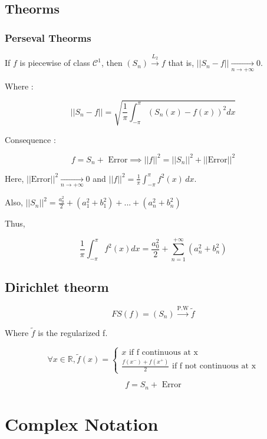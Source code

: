 \documentclass[a4paper,12pt]{article}
\begin{document}
\subsection{Theorms}

\subsubsection{Perseval Theorms}

If $f$ is piecewise of class $\mathcal{C}^1$, then $(S_n) \overset{L_2}{\rightarrow} f$ that is, $||S_n - f|| \underset{n \rightarrow +\infty}{\rightarrow} 0$. \newline

Where : 

\[
||S_n - f|| = \sqrt{\frac{1}{\pi}\int_{-\pi}^{\pi}{(S_n(x) - f(x))^2 dx}}
\]

Consequence :

\[
f = S_n + \text{ Error} \implies ||f||^2 = ||S_n||^2 + ||\text{Error}||^2
\] \newline

Here, $||\text{Error}||^2 \underset{n \rightarrow +\infty}{\rightarrow} 0$ and $||f||^2 = \frac{1}{\pi}\int_{-\pi}^{\pi}{f^2(x)\,dx}$. \newline

Also, $||S_n||^2 = \frac{a_0^2}{2} + (a_1^2 + b_1^2) + ... + (a_n^2 + b_n^2)$ \newline

Thus, 

\[
\frac{1}{\pi}\int_{-\pi}^{\pi}{f^2(x)dx} = \frac{a_0^2}{2} + \sum_{n = 1}^{+\infty}{(a_n^2 + b_n^2)}
\]

\subsection{Dirichlet theorm}

\[
FS(f) = (S_n) \overset{\text{P.W}}{\rightarrow} \tilde{f}   
\]

Where $\tilde{f}$ is the regularized f.

\[
\forall x \in \mathbb{R}, \tilde{f}(x) = \begin{cases}
    x \text{ if f continuous at x} \\
    \frac{f(x^-) + f(x^+)}{2} \text{ if f not continuous at x}
\end{cases}
\]

\[
f = S_n + \text{ Error}
\]

\section{Complex Notation}\bigskip
\end{document}
